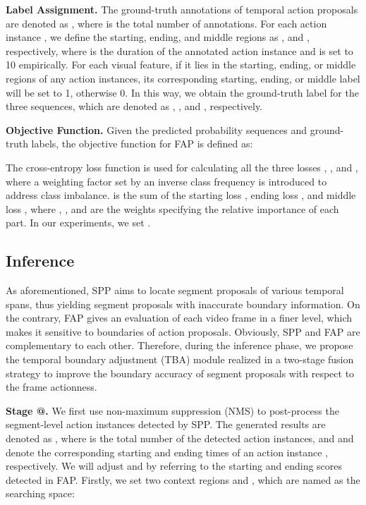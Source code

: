 \documentclass[10pt,twocolumn,letterpaper]{article}
\makeatletter
\newcommand*{\rom}[1]{\expandafter\@slowromancap\romannumeral #1@}
\makeatother
\begin{document}
\textbf{Label Assignment.} The ground-truth annotations of temporal action proposals are denoted as , where
 is the total number of annotations. For each action instance
, we define the starting, ending, and middle
regions as , and ,
respectively, where  is the duration of the
annotated action instance and  is set to 10 empirically. For each visual feature, if it lies in the starting, ending, or
middle regions of any action instances, its corresponding
starting, ending, or middle label will be set to 1, otherwise 0. In this
way, we obtain the ground-truth label for the three sequences, which are denoted
as
 , , and , respectively.

 \textbf{Objective Function.} Given the predicted probability sequences and ground-truth labels, the objective function for FAP is defined as:
 
The cross-entropy loss function is used for calculating  all the  three losses , , and , where a weighting factor set by an inverse class frequency is introduced to address class imbalance.  is the sum of the starting loss , ending loss ,
and middle loss , where , , and
 are the weights specifying the relative importance
of each part. In our experiments, we set .


\subsection{Inference} 
\label{TBA}
As aforementioned, SPP aims to locate segment proposals of various temporal spans, thus yielding segment proposals with inaccurate boundary information. On the contrary, FAP gives an evaluation of each video frame in a finer level, which makes it sensitive to boundaries of action proposals.
Obviously, SPP and FAP are complementary to each other. Therefore, during the inference phase, we propose the temporal boundary adjustment (TBA) module realized in a  two-stage fusion strategy to improve the boundary accuracy of segment proposals with respect to the frame actionness.

\textbf{Stage \rom{1}.} We first use non-maximum suppression (NMS) to post-process the segment-level action instances detected by SPP. The generated results are denoted as , where  is the total number of the detected action instances, and  and  denote the corresponding starting and ending times of an action instance , respectively. We will adjust  and  by referring to the starting and ending scores detected in FAP. Firstly, we set two context regions  and , which are named as the searching space:
\end{document}
